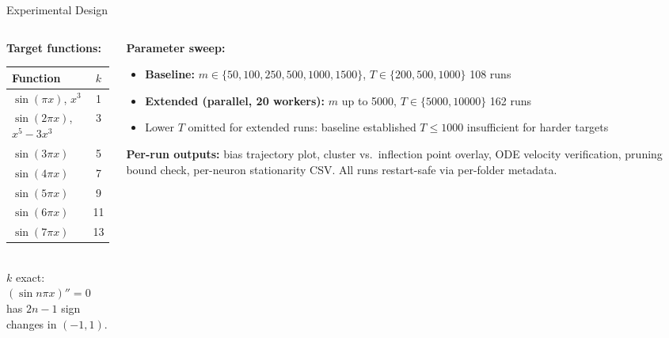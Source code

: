 \documentclass[aspectratio=169, 10pt]{beamer}
\begin{document}
\begin{frame}{Experimental Design}
  \begin{columns}[T]
    \begin{column}{0.38\textwidth}
      \textbf{Target functions:}\\[3pt]
      \renewcommand{\arraystretch}{1.1}
      \small
      \begin{tabular}{lc}
        \toprule
        Function & $k$ \\
        \midrule
        $\sin(\pi x)$,\; $x^3$ & 1 \\
        $\sin(2\pi x)$,\; $x^5-3x^3$ & 3 \\
        $\sin(3\pi x)$ & 5 \\
        $\sin(4\pi x)$ & 7 \\
        $\sin(5\pi x)$ & 9 \\
        $\sin(6\pi x)$ & 11 \\
        $\sin(7\pi x)$ & 13 \\
        \bottomrule
      \end{tabular}\\[5pt]
      \normalsize
      $k$ exact: $(\sin n\pi x)''=0$\\
      has $2n-1$ sign changes in $(-1,1)$.
    \end{column}
    \begin{column}{0.60\textwidth}
      \textbf{Parameter sweep:}
      \begin{itemize}
        \item \textbf{Baseline:}
              $m\!\in\!\{50,100,250,500,1000,1500\}$,\;
              $T\!\in\!\{200,500,1000\}$
              \hfill 108 runs
        \item \textbf{Extended (parallel, 20 workers):}
              $m$ up to 5000,\; $T\!\in\!\{5000,10000\}$
              \hfill 162 runs
        \item Lower $T$ omitted for extended runs: baseline
              established $T\!\leq\!1000$ insufficient for harder
              targets
      \end{itemize}
      \vspace{0.4em}
      \textbf{Per-run outputs:}
      bias trajectory plot,
      cluster vs.\ inflection point overlay,
      ODE velocity verification,
      pruning bound check,
      per-neuron stationarity CSV.
      All runs restart-safe via per-folder metadata.
    \end{column}
  \end{columns}
\end{frame}
\end{document}
